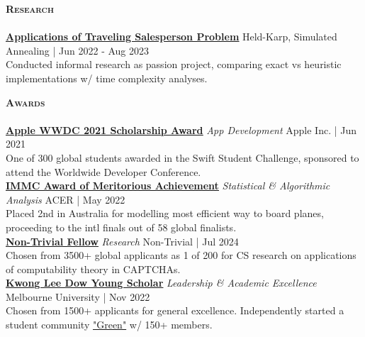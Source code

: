 \documentclass[a4paper]{article}
\newcommand{\lineunder} {
    \vspace*{-8pt} \\
    \hspace*{-10pt} \hrulefill \\
}
\newcommand{\header} [1] {
    {\hspace*{-10pt}\vspace*{6pt} \large\textsc{\textbf{#1}}}
    \vspace*{-6pt} \lineunder
}
\begin{document}
\vspace*{1mm}
\header{Research}
\href{https://garv-shah.github.io/applications_of_tsp.pdf}{\textbf{\ul{Applications of Traveling Salesperson Problem}}} \hfill Held-Karp, Simulated Annealing | Jun 2022 - Aug 2023\\
Conducted informal research as passion project, comparing exact vs heuristic implementations w/ time complexity analyses. \\
\vspace*{1.5mm}

\vspace*{1mm}
\header{Awards}
\href{https://www.wwdcscholars.com/s/DF1A5147-A993-44E4-8739-8A050139A7BA/2021}{\textbf{\ul{Apple WWDC 2021 Scholarship Award}}} \textit{App Development} \hfill Apple Inc. | Jun 2021\\
One of 300 global students awarded in the Swift Student Challenge, sponsored to attend the Worldwide Developer Conference.\\
\vspace*{1.5mm}
\href{https://www.acer.org/au/discover/article/bray-park-and-caulfield-grammar-schools-top-maths-challenge}{\textbf{\ul{IMMC Award of Meritorious Achievement}}} \textit{Statistical \& Algorithmic Analysis} \hfill ACER | May 2022\\
Placed 2nd in Australia for modelling most efficient way to board planes, proceeding to the intl finals out of 58 global finalists.\\
\vspace*{1.5mm}
\href{https://www.non-trivial.org/}{\textbf{\ul{Non-Trivial Fellow}}} \textit{Research} \hfill Non-Trivial | Jul 2024\\
Chosen from 3500+ global applicants as 1 of 200 for CS research on applications of computability theory in CAPTCHAs.\\
\vspace*{1.5mm}
\href{https://www.linkedin.com/posts/caulfield-grammar-school_caulfieldgrammar2022-activity-7001816876439781376-DZpH}{\textbf{\ul{Kwong Lee Dow Young Scholar}}} \textit{Leadership \& Academic Excellence} \hfill Melbourne University | Nov 2022\\
Chosen from 1500+ applicants for general excellence.
Independently started a student community \href{https://garv-shah.github.io/green/}{"Green"} w/ 150+ members.\\
\vspace*{1.5mm}

\end{document}
